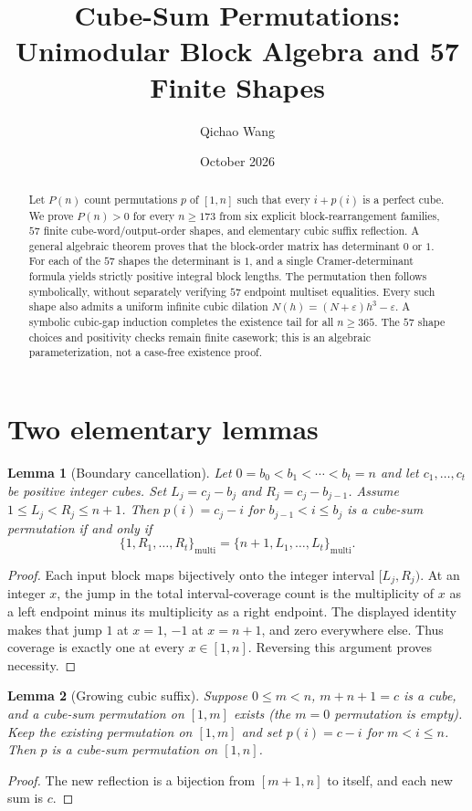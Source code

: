 \documentclass[10pt]{article}
\title{Cube-Sum Permutations: Unimodular Block Algebra and 57 Finite Shapes}
\author{Qichao Wang}
\date{October 2026}
\newtheorem{lemma}{Lemma}
\begin{document}
\maketitle

\begin{abstract}
Let $P(n)$ count permutations $p$ of $[1,n]$
such that every $i+p(i)$ is a perfect cube.
We prove $P(n)>0$ for every $n\ge173$
from six explicit block-rearrangement families,
$57$ finite cube-word/output-order shapes, and
elementary cubic suffix reflection.
A general algebraic theorem proves that the
block-order matrix has determinant $0$ or $1$.
For each of the $57$ shapes the determinant is $1$,
and a single Cramer-determinant formula yields
strictly positive integral block lengths.
The permutation then follows symbolically,
without separately verifying $57$ endpoint
multiset equalities. Every such shape also admits
a uniform infinite cubic dilation
$N(h)=(N+\varepsilon)h^3-\varepsilon$.
A symbolic cubic-gap induction completes
the existence tail for all $n\ge365$.
The $57$ shape choices and positivity checks
remain finite casework; this is an algebraic
parameterization, not a case-free existence proof.
\end{abstract}

\section{Two elementary lemmas}

\begin{lemma}[Boundary cancellation]\label{lem:balance}
Let $0=b_0<b_1<\cdots<b_t=n$ and let
$c_1,\ldots,c_t$ be positive integer cubes.
Set $L_j=c_j-b_j$ and $R_j=c_j-b_{j-1}$.
Assume $1\le L_j<R_j\le n+1$.
Then $p(i)=c_j-i$ for $b_{j-1}<i\le b_j$
is a cube-sum permutation if and only if
\[
\boxed{\{1,R_1,\ldots,R_t\}_{\mathrm{multi}}
 =\{n+1,L_1,\ldots,L_t\}_{\mathrm{multi}}.}
\]
\end{lemma}
\begin{proof}
Each input block maps bijectively onto the integer
interval $[L_j,R_j)$. At an integer $x$, the jump
in the total interval-coverage count is the
multiplicity of $x$ as a left endpoint minus
its multiplicity as a right endpoint.
The displayed identity makes that jump $1$
at $x=1$, $-1$ at $x=n+1$, and zero everywhere
else. Thus coverage is exactly one at
every $x\in[1,n]$. Reversing this argument
proves necessity.
\end{proof}

\begin{lemma}[Growing cubic suffix]\label{lem:suffix}
Suppose $0\le m<n$, $m+n+1=c$ is a cube,
and a cube-sum permutation on $[1,m]$ exists
(the $m=0$ permutation is empty).
Keep the existing permutation on $[1,m]$
and set $p(i)=c-i$ for $m<i\le n$.
Then $p$ is a cube-sum permutation on $[1,n]$.
\end{lemma}
\begin{proof}
The new reflection is a bijection from
$[m+1,n]$ to itself, and each new sum is $c$.
\end{proof}
\end{document}
